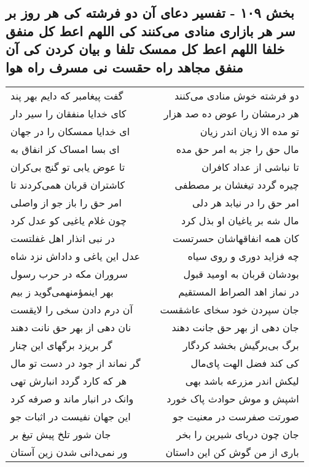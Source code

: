 \begin{center}
\section*{بخش ۱۰۹ - تفسیر دعای آن دو فرشته کی هر روز بر سر هر بازاری منادی می‌کنند کی اللهم اعط کل منفق خلفا اللهم اعط کل ممسک تلفا و بیان کردن کی آن منفق مجاهد راه حقست نی مسرف راه هوا}
\label{sec:sh109}
\begin{longtable}{l p{0.5cm} r}
گفت پیغامبر که دایم بهر پند
&&
دو فرشته خوش منادی می‌کنند
\\
کای خدایا منفقان را سیر دار
&&
هر درمشان را عوض ده صد هزار
\\
ای خدایا ممسکان را در جهان
&&
تو مده الا زیان اندر زیان
\\
ای بسا امساک کز انفاق به
&&
مال حق را جز به امر حق مده
\\
تا عوض یابی تو گنج بی‌کران
&&
تا نباشی از عداد کافران
\\
کاشتران قربان همی‌کردند تا
&&
چیره گردد تیغشان بر مصطفی
\\
امر حق را باز جو از واصلی
&&
امر حق را در نیابد هر دلی
\\
چون غلام یاغیی کو عدل کرد
&&
مال شه بر یاغیان او بذل کرد
\\
در نبی انذار اهل غفلتست
&&
کان همه انفاقهاشان حسرتست
\\
عدل این یاغی و داداش نزد شاه
&&
چه فزاید دوری و روی سیاه
\\
سروران مکه در حرب رسول
&&
بودشان قربان به اومید قبول
\\
بهر اینمؤمنهمی‌گوید ز بیم
&&
در نماز اهد الصراط المستقیم
\\
آن درم دادن سخی را لایقست
&&
جان سپردن خود سخای عاشقست
\\
نان دهی از بهر حق نانت دهند
&&
جان دهی از بهر حق جانت دهند
\\
گر بریزد برگهای این چنار
&&
برگ بی‌برگیش بخشد کردگار
\\
گر نماند از جود در دست تو مال
&&
کی کند فضل الهت پای‌مال
\\
هر که کارد گردد انبارش تهی
&&
لیکش اندر مزرعه باشد بهی
\\
وانک در انبار ماند و صرفه کرد
&&
اشپش و موش حوادث پاک خورد
\\
این جهان نفیست در اثبات جو
&&
صورتت صفرست در معنیت جو
\\
جان شور تلخ پیش تیغ بر
&&
جان چون دریای شیرین را بخر
\\
ور نمی‌دانی شدن زین آستان
&&
باری از من گوش کن این داستان
\\
\end{longtable}
\end{center}
